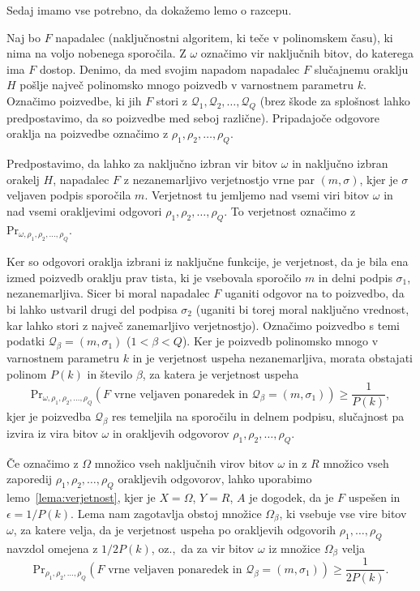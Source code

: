 \documentclass[isrm2, tisk]{fmfdelo}
\begin{document}
Sedaj imamo vse potrebno, da dokažemo lemo o razcepu.

\begin{dokaz}
    Naj bo $F$ napadalec (naključnostni algoritem, ki teče v polinomskem času), ki nima na voljo
    nobenega sporočila. Z $\omega$ označimo vir naključnih bitov, do katerega ima $F$ dostop. Denimo,
    da med svojim napadom napadalec $F$ slučajnemu oraklju $H$ pošlje največ polinomsko mnogo poizvedb
    v varnostnem parametru $k$. Označimo  poizvedbe, ki jih $F$ stori z $\mathcal{Q}_1, \mathcal{Q}_2,
    \dots, \mathcal{Q}_Q$ (brez škode za splošnost lahko predpostavimo, da so poizvedbe med seboj
    različne). Pripadajoče odgovore oraklja na poizvedbe označimo z $\rho_1, \rho_2 , \dots, \rho_Q$.

    Predpostavimo, da lahko za naključno izbran vir bitov $\omega$ in naključno izbran orakelj $H$,
    napadalec $F$ z nezanemarljivo verjetnostjo vrne par $(m, \sigma)$, kjer je $\sigma$ veljaven podpis
    sporočila $m$. Verjetnost tu jemljemo nad vsemi viri bitov $\omega$ in nad vsemi orakljevimi
    odgovori $\rho_1, \rho_2, \dots, \rho_Q$. To verjetnost označimo z $\text{Pr}_{\omega, \rho_1,
    \rho_2 , \dots, \rho_Q}$. 

    Ker so odgovori oraklja izbrani iz naključne funkcije, je verjetnost, da je bila ena izmed
    poizvedb oraklju prav tista, ki je vsebovala sporočilo $m$ in delni podpis $\sigma_1$,
    nezanemarljiva. Sicer bi moral napadalec $F$ uganiti odgovor na to poizvedbo, da bi
    lahko ustvaril drugi del podpisa $\sigma_2$ (uganiti bi torej moral naključno vrednost, kar lahko
    stori z največ zanemarljivo verjetnostjo). Označimo poizvedbo s temi podatki $\mathcal{Q}_\beta
    = (m, \sigma_1)$ ($1 < \beta < Q$). Ker je poizvedb polinomsko mnogo v varnostnem parametru $k$
    in je verjetnost uspeha nezanemarljiva, morata obstajati polinom $P(k)$ in število $\beta$, za
    katera je verjetnost uspeha
    $$
    \text{Pr}_{\omega, \rho_1, \rho_2 , \dots, \rho_Q}(\text{$F$ vrne veljaven ponaredek in } \mathcal{Q}_\beta
    = (m, \sigma_1)) \geq \frac{1}{P(k)},
    $$
    kjer je poizvedba $\mathcal{Q}_\beta$ res temeljila na sporočilu in delnem podpisu, slučajnost
    pa izvira iz vira bitov $\omega$ in orakljevih odgovorov $\rho_1, \rho_2, \dots, \rho_Q$.

    Če označimo z $\Omega$ množico vseh naključnih virov bitov $\omega$ in z $R$ množico vseh
    zaporedij $\rho_1, \rho_2, \dots, \rho_Q$ orakljevih odgovorov, lahko uporabimo lemo~\ref{lema:verjetnost},
    kjer je $X = \Omega$, $Y = R$, $A$ je dogodek, da je $F$ uspešen in $\epsilon = 1/P(k)$.
    Lema nam zagotavlja obstoj množice $\Omega_\beta$, ki vsebuje vse vire bitov $\omega$, za katere
    velja, da je verjetnost uspeha po orakljevih odgovorih $\rho_1, \dots, \rho_Q$ navzdol omejena z
    $1/2P(k)$, oz.,\ da za vir bitov $\omega$ iz množice $\Omega_\beta$ velja
    $$
    \text{Pr}_{\rho_1, \rho_2, \dots, \rho_Q}(\text{$F$ vrne veljaven ponaredek in } \mathcal{Q}_\beta
    = (m, \sigma_1)) \geq \frac{1}{2P(k)}.
    $$


\end{dokaz}
\end{document}
